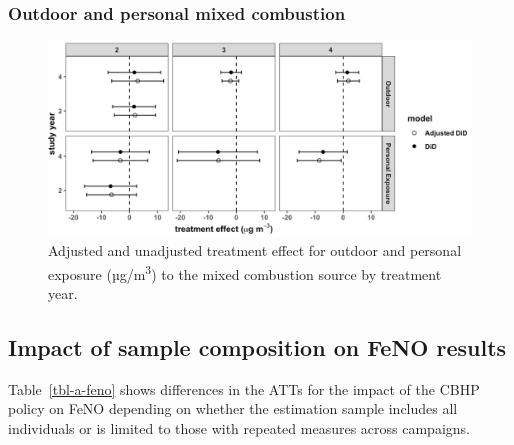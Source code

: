 \documentclass[
  letterpaper,
  DIV=11,
  numbers=noendperiod]{scrartcl}
\begin{document}
\hypertarget{outdoor-and-personal-mixed-combustion}{%
\subsubsection{Outdoor and personal mixed
combustion}\label{outdoor-and-personal-mixed-combustion}}

\begin{figure}[H]

{\centering \includegraphics[width=1\textwidth,height=\textheight]{images/did-mixed-ct.png}

}

\caption{\label{fig-afig-mixed-ct}Adjusted and unadjusted treatment
effect for outdoor and personal exposure (µg/m\textsuperscript{3}) to
the mixed combustion source by treatment year.}

\end{figure}

\newpage

\hypertarget{impact-of-sample-composition-on-feno-results}{%
\subsection{Impact of sample composition on FeNO
results}\label{impact-of-sample-composition-on-feno-results}}

Table~\ref{tbl-a-feno} shows differences in the ATTs for the impact of
the CBHP policy on FeNO depending on whether the estimation sample
includes all individuals or is limited to those with repeated measures
across campaigns.
\end{document}

